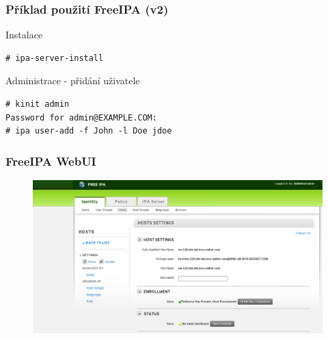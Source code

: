 \documentclass[pdftex,unicode,xcolor=table]{beamer}
\begin{document}
\begin{frame}[fragile]
    \frametitle{Příklad použití FreeIPA (v2)}
    \begin{exampleblock}{Instalace}
\begin{verbatim}
# ipa-server-install
\end{verbatim}
    \end{exampleblock}

    \begin{exampleblock}{Administrace - přidání uživatele}
\begin{verbatim}
# kinit admin
Password for admin@EXAMPLE.COM:
# ipa user-add -f John -l Doe jdoe
\end{verbatim}
    \end{exampleblock}
\end{frame}

\begin{frame}
    \frametitle{FreeIPA WebUI}
    \begin{figure}
        \includegraphics[scale=0.28]{img/ipa-webui.png}
    \end{figure}
\end{frame}
\end{document}
